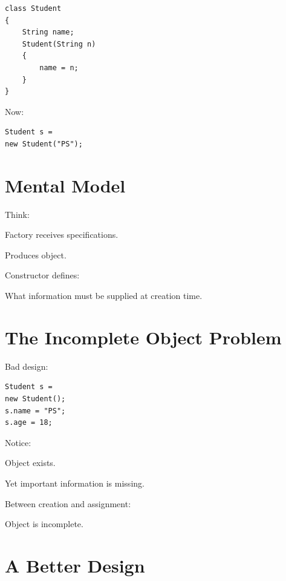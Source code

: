 \documentclass[11pt,a4paper]{book}
\begin{document}
\begin{verbatim}
class Student
{
    String name;
    Student(String n)
    {
        name = n;
    }
}
\end{verbatim}

Now:

\begin{verbatim}
Student s =
new Student("PS");
\end{verbatim}


\section{Mental Model}

\begin{mentalmodel}

Think:

Factory receives specifications.

Produces object.

Constructor defines:

What information must be supplied
at creation time.

\end{mentalmodel}


\section{The Incomplete Object Problem}

Bad design:

\begin{verbatim}
Student s =
new Student();
s.name = "PS";
s.age = 18;
\end{verbatim}

Notice:

Object exists.

Yet important information is missing.


Between creation and assignment:

\begin{center}
Object is incomplete.
\end{center}


\section{A Better Design}
\end{document}

